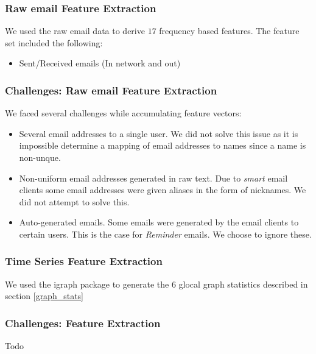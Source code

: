 \documentclass[11pt,letterpaper]{article}
\begin{document}
\subsubsection{Raw email Feature Extraction}
We used the raw email data to derive $17$ frequency based features. The feature set
included the following: 
\begin{itemize}
\item Sent/Received emails (In network and out)
\end{itemize}

\subsubsection{Challenges: Raw email Feature Extraction}
We faced several challenges while accumulating feature vectors:
\begin{itemize}
\item Several email addresses to a single user. We did not solve this issue as it is
impossible determine a mapping of email addresses to names since a name is non-unque.
\item Non-uniform email addresses generated in raw text. Due to \textit{smart} email clients
some email addresses were given aliases in the form of nicknames. We did not attempt to
solve this.
\item Auto-generated emails. Some emails were generated by the email clients to certain
users. This is the case for \textit{Reminder} emails. We choose to ignore these.
\end{itemize}


\subsubsection{Time Series Feature Extraction}
We used the igraph \cite{igraph2006} package to generate the 6 glocal graph statistics
described in section \ref{graph_stats}

\subsubsection{Challenges: Feature Extraction}
Todo
\end{document}
